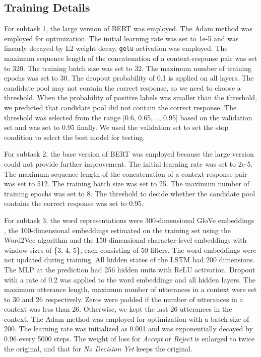\documentclass[letterpaper]{article} \usepackage{aaai20}  \usepackage{times}  \usepackage{helvet} \usepackage{courier}  \usepackage[hyphens]{url}  \usepackage{graphicx} \urlstyle{rm} \def\UrlFont{\rm}  \usepackage{graphicx}  \frenchspacing  \setlength{\pdfpagewidth}{8.5in}  \setlength{\pdfpageheight}{11in}
\begin{document}
  \subsection{Training Details}

    For subtask 1, the large version of BERT was employed.
    The Adam method \cite{DBLP:journals/corr/KingmaB14} was employed for optimization.
    The initial learning rate was set to 1e-5 and was linearly decayed by L2 weight decay.
    \texttt{gelu} activation \cite{DBLP:journals/corr/HendrycksG16} was employed.
    The maximum sequence length of the concatenation of a context-response pair was set to 320.
    The training batch size was set to 32.
    The maximum number of training epochs was set to 30.
    The dropout \cite{DBLP:journals/jmlr/SrivastavaHKSS14} probability of 0.1 is applied on all layers.
    The candidate pool may not contain the correct response, so we need to choose a threshold.
    When the probability of positive labels was smaller than the threshold, we predicted that candidate pool did not contain the correct response.
    The threshold was selected from the range [0.6, 0.65, .., 0.95] based on the validation set and was set to 0.95 finally.
    We used the validation set to set the stop condition to select the best model for testing.

    For subtask 2, the base version of BERT was employed because the large version could not provide further improvement.
    The initial learning rate was set to 2e-5.
    The maximum sequence length of the concatenation of a context-response pair was set to 512.
    The training batch size was set to 25.
    The maximum number of training epochs was set to 8.
    The threshold to decide whether the candidate pool contains the correct response was set to 0.95.

    For subtask 3, the word representations were 300-dimensional GloVe embeddings \cite{DBLP:conf/emnlp/PenningtonSM14}, the 100-dimensional embeddings estimated on the training set using the Word2Vec algorithm \cite{DBLP:conf/nips/MikolovSCCD13} and the 150-dimensional character-level embeddings with window sizes of \{3, 4,  5\}, each consisting of 50 filters.
    The word embeddings were not updated during training.
    All hidden states of the LSTM had 200 dimensions.
    The MLP at the prediction had 256 hidden units with ReLU \cite{DBLP:conf/icml/NairH10} activation.
    Dropout with a rate of 0.2 was applied to the word embeddings and all hidden layers.
    The maximum utterance length, maximum number of utterances in a context were set to 30 and 26 respectively.
    Zeros were padded if the number of utterances in a context was less than 26.
    Otherwise, we kept the last 26 utterances in the context.
    The Adam method was employed for optimization with a batch size of 200.
    The learning rate was initialized as 0.001 and was exponentially decayed by 0.96 every 5000 steps.
    The weight of loss for \emph{Accept} or \emph{Reject} is enlarged to twice the original, and that for \emph{No Decision Yet} keeps the original.
\end{document}
